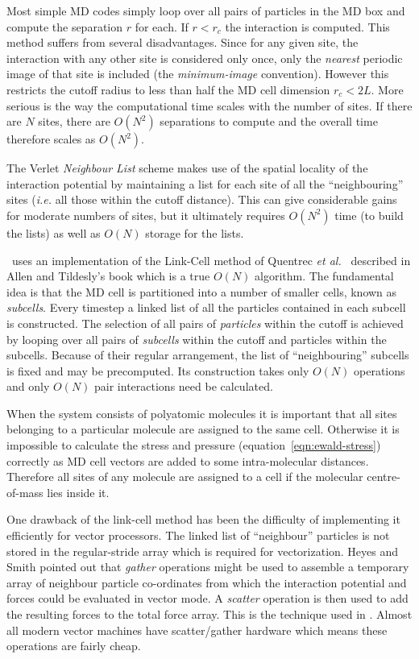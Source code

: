 Most simple MD codes simply loop over all pairs of particles in the MD
box and compute the separation $r$ for each.  If $r < r_c$ the
interaction is computed.  This method suffers from several
disadvantages.  Since for any given site, the interaction with any
other site is considered only once, only the {\em nearest} periodic
image of that site is included (the {\em minimum-image} convention).
However this restricts the cutoff radius to less than half the MD cell
dimension $r_c < 2L$.  More serious is the way the computational
time scales with the number of sites.  If there are $N$ sites, there
are $O(N^2)$ separations to compute and the overall time therefore scales
as $O(N^2)$.

The Verlet {\em Neighbour List} scheme \cite[pp 146-149]{allen:87} makes
use of the spatial locality of the interaction potential by
maintaining a list for each site of all the ``neighbouring'' sites
({\em i.e.} all those within the cutoff distance).  This can give
considerable gains for moderate numbers of sites, but it ultimately
requires $O(N^2)$ time (to build the lists) as well as $O(N)$ storage for
the lists.

\moldy\ uses an implementation of the Link-Cell method of Quentrec {\em
et al.\ } \cite{quentrec:75} described in Allen and Tildesly's book
\cite[pp 149-152]{allen:87} which is a true $O(N)$ algorithm.  
The fundamental idea is that the MD cell is partitioned into a number
of smaller cells, known as {\em subcells}.  Every timestep a linked
list of all the particles contained in each subcell is constructed.
The selection of all pairs of {\em particles} within the cutoff is
achieved by looping over all pairs of {\em subcells} within the cutoff
and particles within the subcells.  Because of their regular
arrangement, the list of ``neighbouring'' subcells is fixed and may be
precomputed.  Its construction takes only $O(N)$ operations and only
$O(N)$ pair interactions need be calculated.


When the system consists of polyatomic molecules it is important that
all sites belonging to a particular molecule are assigned to the same
cell.  Otherwise it is impossible to calculate the stress and pressure
(equation~\ref{eqn:ewald-stress}) correctly as MD cell vectors are
added to some intra-molecular distances.  Therefore all sites of any
molecule are assigned to a cell if the molecular centre-of-mass lies
inside it.

One drawback of the link-cell method has been the difficulty of
implementing it efficiently for vector processors.  The linked list of
``neighbour'' particles is not stored in the regular-stride array
which is required for vectorization.  Heyes and Smith \cite{heyes:87}
pointed out that {\em gather} operations might be used to assemble a
temporary array of neighbour particle co-ordinates from which the
interaction potential and forces could be evaluated in vector mode.  A
{\em scatter} operation is then used to add the resulting forces to
the total force array.  This is the technique used in \moldy.  Almost
all modern vector machines have scatter/gather hardware which means
these operations are fairly cheap.

